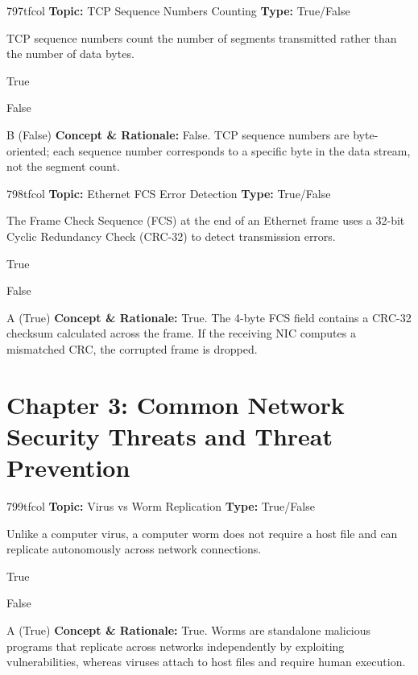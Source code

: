 \begin{qcard}{797}{tfcol}
\textcolor{darkslate!75}{\small\textbf{Topic:} TCP Sequence Numbers Counting \hfill \textbf{Type:} True/False}\vspace{0.4em}\par
TCP sequence numbers count the number of segments transmitted rather than the number of data bytes.
\begin{qoptions}
\item True
\item False
\end{qoptions}
\end{qcard}
\nopagebreak
\begin{explainbox}{B (False)}
\textbf{Concept \& Rationale:} False. TCP sequence numbers are byte-oriented; each sequence number corresponds to a specific byte in the data stream, not the segment count.
\end{explainbox}

\begin{qcard}{798}{tfcol}
\textcolor{darkslate!75}{\small\textbf{Topic:} Ethernet FCS Error Detection \hfill \textbf{Type:} True/False}\vspace{0.4em}\par
The Frame Check Sequence (FCS) at the end of an Ethernet frame uses a 32-bit Cyclic Redundancy Check (CRC-32) to detect transmission errors.
\begin{qoptions}
\item True
\item False
\end{qoptions}
\end{qcard}
\nopagebreak
\begin{explainbox}{A (True)}
\textbf{Concept \& Rationale:} True. The 4-byte FCS field contains a CRC-32 checksum calculated across the frame. If the receiving NIC computes a mismatched CRC, the corrupted frame is dropped.
\end{explainbox}

\section{Chapter 3: Common Network Security Threats and Threat Prevention}

\begin{qcard}{799}{tfcol}
\textcolor{darkslate!75}{\small\textbf{Topic:} Virus vs Worm Replication \hfill \textbf{Type:} True/False}\vspace{0.4em}\par
Unlike a computer virus, a computer worm does not require a host file and can replicate autonomously across network connections.
\begin{qoptions}
\item True
\item False
\end{qoptions}
\end{qcard}
\nopagebreak
\begin{explainbox}{A (True)}
\textbf{Concept \& Rationale:} True. Worms are standalone malicious programs that replicate across networks independently by exploiting vulnerabilities, whereas viruses attach to host files and require human execution.
\end{explainbox}

